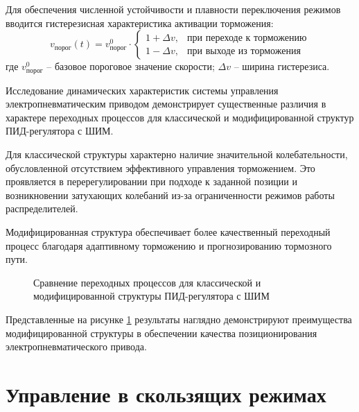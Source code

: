 Для обеспечения численной устойчивости и плавности переключения режимов вводится гистерезисная характеристика активации торможения:
\begin{equation*}\label{eq:hysteresis}
	v_{\text{порог}}(t) = v_{\text{порог}}^0 \cdot \begin{cases}
		1 + \Delta v, & \text{при переходе к торможению} \\
		1 - \Delta v, & \text{при выходе из торможения}
	\end{cases}
\end{equation*}
где $v_{\text{порог}}^0$ -- базовое пороговое значение скорости;
$\Delta v$ -- ширина гистерезиса.

Исследование динамических характеристик системы управления электропневматическим приводом демонстрирует существенные различия
в характере переходных процессов для классической и модифицированной структур ПИД-регулятора с ШИМ.

Для классической структуры характерно наличие значительной колебательности, обусловленной отсутствием эффективного
управления торможением. Это проявляется в перерегулировании при подходе к заданной позиции и возникновении
затухающих колебаний из-за ограниченности режимов работы распределителей.

Модифицированная структура обеспечивает более качественный переходный процесс благодаря
адаптивному торможению и прогнозированию тормозного пути.

\begin{figure}[ht]
	\caption{Сравнение переходных процессов для классической и модифицированной структуры ПИД-регулятора с ШИМ}
	\label{fig:ch3:transient_comparison}
\end{figure}

Представленные на рисунке \ref{fig:ch3:transient_comparison} результаты наглядно демонстрируют
преимущества модифицированной структуры в обеспечении качества позиционирования электропневматического привода.


\section{Управление в скользящих режимах}\label{sec:ch3/sec3}

